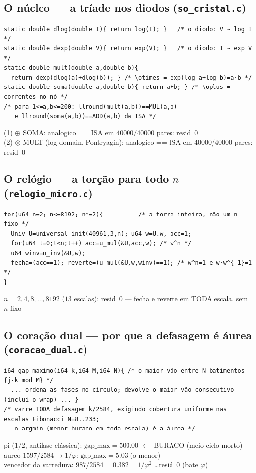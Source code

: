 \documentclass[11pt,a4paper]{article}
\begin{document}
\subsection{O núcleo --- a tríade nos diodos (\texttt{so\_cristal.c})}
\begin{lstlisting}
static double dlog(double I){ return log(I); }   /* o diodo: V ~ log I */
static double dexp(double V){ return exp(V); }   /* o diodo: I ~ exp V */
static double mult(double a,double b){
  return dexp(dlog(a)+dlog(b)); } /* \otimes = exp(log a+log b)=a·b */
static double soma(double a,double b){ return a+b; } /* \oplus = correntes no nó */
/* para 1<=a,b<=200: llround(mult(a,b))==MUL(a,b)
   e llround(soma(a,b))==ADD(a,b) da ISA */
\end{lstlisting}
(1) $\oplus$ SOMA: analogico == ISA em $40000/40000$ pares: resid~$0$\\
(2) $\otimes$ MULT (log-domain, Pontryagin): analogico == ISA em $40000/40000$ pares: resid~$0$

\subsection{O relógio --- a torção para todo $n$ (\texttt{relogio\_micro.c})}
\begin{lstlisting}
for(u64 n=2; n<=8192; n*=2){          /* a torre inteira, não um n fixo */
  Univ U=universal_init(40961,3,n); u64 w=U.w, acc=1;
  for(u64 t=0;t<n;t++) acc=u_mul(&U,acc,w); /* w^n */
  u64 winv=u_inv(&U,w);
  fecha=(acc==1); reverte=(u_mul(&U,w,winv)==1); /* w^n=1 e w·w^{-1}=1 */
}
\end{lstlisting}
$n=2,4,8,\ldots,8192$ ($13$ escalas): resid~$0$ --- fecha e reverte em TODA escala, sem $n$ fixo

\subsection{O coração dual --- por que a defasagem é áurea (\texttt{coracao\_dual.c})}
\begin{lstlisting}
i64 gap_maximo(i64 k,i64 M,i64 N){ /* o maior vão entre N batimentos {j·k mod M} */
  ... ordena as fases no círculo; devolve o maior vão consecutivo (inclui o wrap) ... }
/* varre TODA defasagem k/2584, exigindo cobertura uniforme nas escalas Fibonacci N=8..233;
   o argmin (menor buraco em toda escala) é a áurea */
\end{lstlisting}
pi ($1/2$, antifase clássica): $\mathrm{gap\_max}=500.00$ $\leftarrow$ BURACO (meio ciclo morto)\\
aureo $1597/2584\to 1/\varphi$: $\mathrm{gap\_max}=5.03$ (o menor)\\
vencedor da varredura: $987/2584=0.382=1/\varphi^{2}$ \ldots resid~$0$ (bate $\varphi$)
\end{document}
